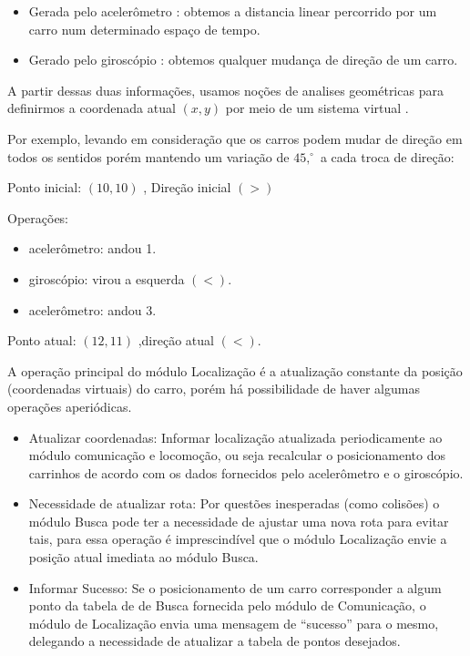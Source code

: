\documentclass{abnt}
\begin{document}
         \begin{itemize}
             \item Gerada pelo acelerômetro : obtemos a distancia linear
                 percorrido por um carro num determinado espaço de tempo.
             \item Gerado pelo giroscópio : obtemos qualquer mudança de direção
                 de um carro.
         \end{itemize}
        
        A partir dessas duas informações, usamos noções de analises geométricas para
        definirmos a coordenada atual $(x,y)$ por meio de um sistema virtual . 

        Por exemplo, levando em consideração que os carros podem mudar de direção em
        todos os sentidos porém mantendo um variação de
        $45,^{\circ}$ a cada troca de direção:

        Ponto inicial: $(10,10)$ , Direção inicial $(>)$

        Operações:

         \begin{itemize}
            \item acelerômetro: andou 1.
            \item giroscópio: virou a esquerda $(<)$.
            \item acelerômetro: andou 3.
         \end{itemize}
         Ponto atual: $(12,11)$ ,direção atual $(<)$.

         A operação principal do módulo Localização é a atualização constante
         da posição (coordenadas virtuais) do carro, porém há possibilidade de
         haver algumas operações aperiódicas.

         \begin{itemize}
         \item Atualizar coordenadas: Informar localização atualizada periodicamente
         ao módulo comunicação e locomoção, ou seja recalcular o posicionamento dos
         carrinhos de acordo com os dados fornecidos pelo acelerômetro e o
         giroscópio.
         \item Necessidade de atualizar rota: Por questões inesperadas (como
         colisões) o módulo Busca pode ter a necessidade de ajustar uma nova
         rota para evitar tais, para essa operação é imprescindível que o
         módulo Localização envie a posição atual imediata ao módulo Busca. 
         \item Informar Sucesso: Se o posicionamento de um carro corresponder a algum
         ponto da tabela de de Busca fornecida pelo módulo de Comunicação, o
         módulo de Localização envia uma mensagem de “sucesso” para o mesmo,
         delegando a necessidade de atualizar a tabela de pontos desejados.
         \end{itemize}
\end{document}
